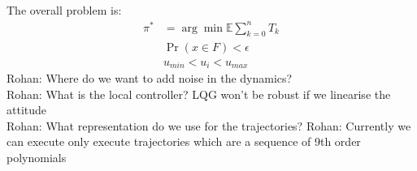 \documentclass[conference]{IEEEtran}
\newcommand{\rohan}[1]{{\color{blue} Rohan: #1}}
\begin{document}
 The overall problem is:
\begin{align}
\pi^{*} &= \arg\min \mathbb{E}\sum_{k=0}^n T_k\\
\nonumber & \Pr(x\in F) < \epsilon \\
\nonumber & u_{min} < u_i < u_{max}
\end{align}
\rohan{Where do we want to add noise in the dynamics?} \\
\rohan{What is the local controller? LQG won't be robust if we linearise the attitude} \\
\rohan{What representation do we use for the trajectories?} 
\rohan{Currently we can execute only execute trajectories which are a sequence of 9th order polynomials}
\printbibliography

\end{document}
